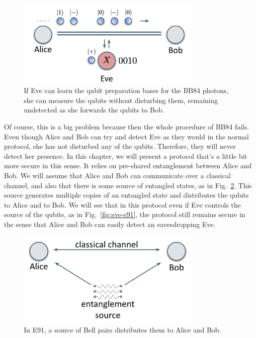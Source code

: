 \begin{figure}[H]
    \centering
    \includegraphics[width=0.8\textwidth]{lesson10/eavesdropping-on-bb84.png}
        \caption[Successful eavesdropping on BB84]{If Eve can learn the qubit preparation bases for the BB84 photons, she can measure the qubits without disturbing them, remaining undetected as she forwards the qubits to Bob.}
    \label{fig:eve-bb84}
\end{figure}

Of course, this is a big problem because then the whole procedure of BB84 fails. Even though Alice and Bob can try and detect Eve as they would in the normal protocol, she has not disturbed any of the qubits. Therefore, they will never detect her presence. In this chapter, we will present a protocol that's a little bit more secure in this sense. It relies on pre-shared entanglement between Alice and Bob. We will assume that Alice and Bob can communicate over a classical channel, and also that there is some source of entangled states, as in Fig.~\ref{fig:e91-setup}. This source generates multiple copies of an entangled state and distributes the qubits to Alice and to Bob. We will see that in this protocol even if Eve controls the source of the qubits, as in Fig.~\ref{fig:eve-e91}, the protocol still remains secure in the sense that Alice and Bob can easily detect an eavesdropping Eve.

\begin{figure}[H]
    \centering
    \includegraphics[width=0.8\textwidth]{lesson10/e91-setup.png}
        \caption[E91 setup]{In E91, a source of Bell pairs distributes them to Alice and Bob.}
    \label{fig:e91-setup}
\end{figure}

